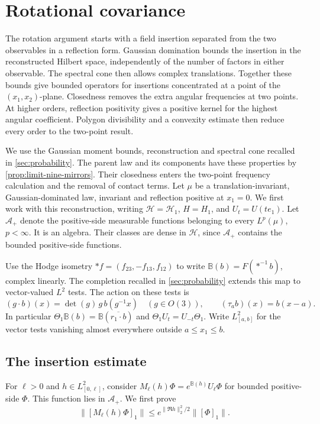 \section{Rotational covariance}\label{sec:rotations}

The rotation argument starts with a field insertion separated from
the two observables in a reflection form. Gaussian domination bounds
the insertion in the reconstructed Hilbert space, independently of
the number of factors in either observable. The spectral cone then
allows complex translations. Together these bounds give bounded
operators for insertions concentrated at a point of the
$(x_1,x_2)$-plane. Closedness removes the extra angular frequencies
at two points. At higher orders, reflection positivity gives a positive
kernel for the highest angular coefficient. Polygon divisibility and a
convexity estimate then reduce every order to the two-point result.


We use the Gaussian moment bounds, reconstruction and spectral cone
recalled in \cref{sec:probability}. The parent law and its components
have these properties by \cref{prop:limit-nine-mirrors}. Their
closedness enters the two-point frequency calculation and the
removal of contact terms.
Let $\mu$ be a translation-invariant, Gaussian-dominated law,
invariant and reflection positive at $x_1=0$.
We first work with this reconstruction, writing
$\mathcal H=\mathcal H_1$, $H=H_1$, and
$U_t=U(te_1)$.
Let $\mathcal A_+$ denote the positive-side measurable functions
belonging to every $L^p(\mu)$, $p<\infty$. It is an algebra.
Their classes are dense in $\mathcal H$, since $\mathcal A_+$
contains the bounded positive-side functions.

Use the Hodge isometry
$*f=(f_{23},-f_{13},f_{12})$ to write
$\mathbb B(b)=F(*^{-1}b)$, complex linearly. The completion recalled
in \cref{sec:probability} extends this map to vector-valued $L^2$ tests.
The action on these tests is
\[
 (g\cdot b)(x)=\det(g)\,g\,b(g^{-1}x)
 \quad(g\in O(3)),\qquad
 (\tau_a b)(x)=b(x-a).
\]
In particular
$\Theta_1\mathbb B(b)=\mathbb B(\overline{r_1\cdot b})$
and $\Theta_1U_t=U_{-t}\Theta_1$.
Write $L^2_{[a,b]}$ for the vector tests vanishing almost everywhere
outside $a\le x_1\le b$.

\subsection{The insertion estimate}\label{subsec:rotation-insertion}

For $\ell>0$ and $h\in L^2_{[0,\ell]}$, consider
$M_\ell(h)\Phi=e^{\mathbb B(h)}U_\ell\Phi$ for bounded
positive-side $\Phi$. This function lies in $\mathcal A_+$.
We first prove
\begin{equation}\label{eq:rotation-source-bound}
 \|[M_\ell(h)\Phi]_1\|
       \le e^{\|\Re h\|_2^2/2}\|[\Phi]_1\|.
\end{equation}


